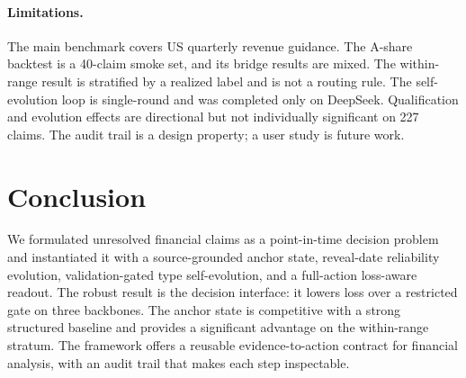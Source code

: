 \documentclass[11pt]{article}
\begin{document}
\paragraph{Limitations.}
The main benchmark covers US quarterly revenue guidance. The A-share backtest is a 40-claim smoke set, and its bridge results are mixed. The within-range result is stratified by a realized label and is not a routing rule. The self-evolution loop is single-round and was completed only on DeepSeek. Qualification and evolution effects are directional but not individually significant on 227 claims. The audit trail is a design property; a user study is future work.

\section{Conclusion}

We formulated unresolved financial claims as a point-in-time decision problem and instantiated it with a source-grounded anchor state, reveal-date reliability evolution, validation-gated type self-evolution, and a full-action loss-aware readout. The robust result is the decision interface: it lowers loss over a restricted gate on three backbones. The anchor state is competitive with a strong structured baseline and provides a significant advantage on the within-range stratum. The framework offers a reusable evidence-to-action contract for financial analysis, with an audit trail that makes each step inspectable.


\end{document}
